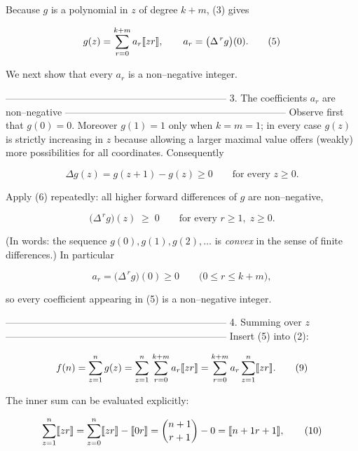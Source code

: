 Because \(g\) is a polynomial in \(z\) of degree \(k+m\),
(3) gives

\[
g(z)=\sum_{r=0}^{k+m}a_{r}\llbracket z\\ r\rrbracket ,
\qquad a_{r}=\bigl(\Delta^{\,r}g\bigr)(0).
\tag{5}
\]

We next show that every \(a_{r}\) is a non–negative integer.

--------------------------------------------------------------------
3.  The coefficients \(a_{r}\) are non–negative  
--------------------------------------------------------------------
Observe first that \(g(0)=0\).  Moreover \(g(1)=1\) only when
\(k=m=1\); in every case \(g(z)\) is strictly increasing in \(z\) because
allowing a larger maximal value offers (weakly) more possibilities for
all coordinates.  Consequently  

\[
\Delta g(z)=g(z+1)-g(z)\ge 0
\qquad\text{for every }z\ge 0 .
\tag{6}
\]

Apply (6) repeatedly:
all higher forward differences of \(g\) are non–negative,

\[
\bigl(\Delta^{\,r}g\bigr)(z)\;\ge\;0
\qquad\text{for every }r\ge 1,\;z\ge 0.
\tag{7}
\]

(In words: the sequence \(g(0),g(1),g(2),\dots\) is {\it convex} in the
sense of finite differences.)  In particular  

\[
a_{r}=\bigl(\Delta^{\,r}g\bigr)(0)\ge 0
\qquad\bigl(0\le r\le k+m\bigr),
\tag{8}
\]

so every coefficient appearing in (5) is a non–negative integer.

--------------------------------------------------------------------
4.  Summing over \(z\)  
--------------------------------------------------------------------
Insert (5) into (2):

\[
f(n)=\sum_{z=1}^{n}g(z)
    =\sum_{z=1}^{n}\,
      \sum_{r=0}^{k+m}a_{r}\llbracket z\\ r\rrbracket
    =\sum_{r=0}^{k+m}a_{r}
      \sum_{z=1}^{n}\llbracket z\\ r\rrbracket .
\tag{9}
\]

The inner sum can be evaluated explicitly:

\[
\sum_{z=1}^{n}\llbracket z\\ r\rrbracket
 =\sum_{z=0}^{n}\llbracket z\\ r\rrbracket
          -\llbracket 0\\ r\rrbracket
 =\binom{n+1}{r+1}-0
 =\llbracket n+1\\ r+1\rrbracket ,
\tag{10}
\]

